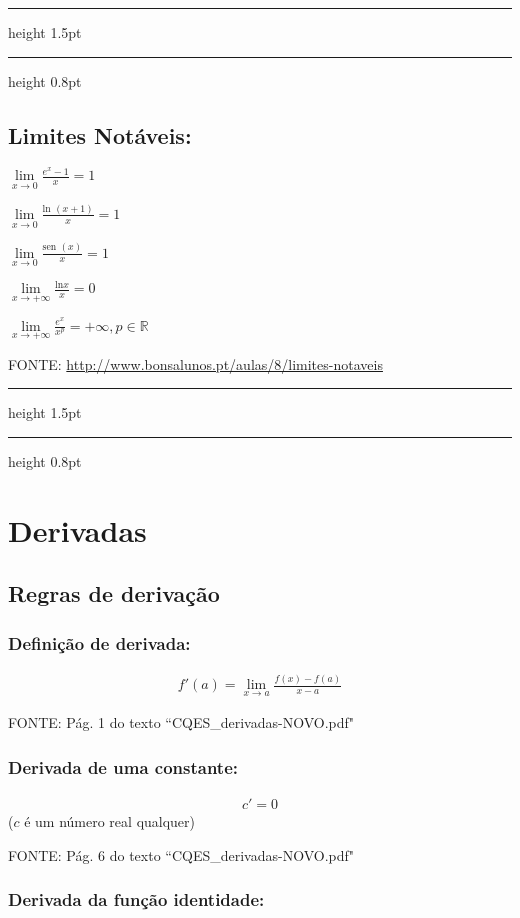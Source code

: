 \documentclass[portuguese,a4paper,12pt,onecolumn,fleqn]{article}
\newcommand{\myline}{\par
  \kern3pt %
  \hrule height 1.5pt
  \kern2pt %
  \hrule height 0.8pt
  \kern3pt %
}
\begin{document}
\myline	%

\subsection*{Limites Notáveis:}

$\lim\limits_{x \to 0} \frac{e^x - 1}{x} = 1$

$\lim\limits_{x \to 0} \frac{\textrm{ln } (x+1)}{x} = 1$

$\lim\limits_{x \to 0} \frac{\textrm{sen } (x)}{x} = 1$

$\lim\limits_{x \to +\infty} \frac{\textrm{ln} x}{x} = 0$

$\lim\limits_{x \to +\infty} \frac{e^x}{x^p} = + \infty , p \in \mathbb{R}$


FONTE: \url{http://www.bonsalunos.pt/aulas/8/limites-notaveis}

\myline	%

\section*{Derivadas}

\subsection*{Regras de derivação}

\subsubsection*{Definição de derivada:}

\begin{gather*}
f'(a) = \lim_{x \to a} \frac{f(x) - f(a)}{x - a}
\end{gather*}

FONTE: Pág. 1 do texto ``CQES\_derivadas-NOVO.pdf"


\subsubsection*{Derivada de uma constante:}

\begin{gather*}
c' = 0 
\end{gather*}
($c$ é um número real qualquer)

FONTE: Pág. 6 do texto ``CQES\_derivadas-NOVO.pdf"


\subsubsection*{Derivada da função identidade:}
\end{document}
